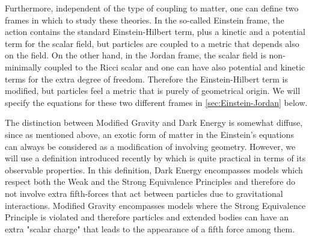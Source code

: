 Furthermore, independent of the type of coupling to matter,
one can define two frames in which to study these theories. 
In the so-called Einstein frame, the action contains the standard Einstein-Hilbert term, plus a kinetic and a potential term for the scalar field,
but particles are coupled to a metric that depends also
on the field. 
On the other hand, in the Jordan frame, the scalar field is non-minimally coupled
to the Ricci scalar and one can have also potential
and kinetic terms for the extra degree of freedom. Therefore the Einstein-Hilbert term is modified, but particles feel a metric that is purely of geometrical origin. We will specify the equations for these two different frames in
\cref{sec:Einstein-Jordan} below.


The distinction between Modified Gravity and Dark Energy is somewhat diffuse, since as mentioned above, 
an exotic form of matter in the Einstein's equations can always be considered as a modification 
of involving geometry. However, we will use a definition introduced recently by \cite{cite Joyce, Lombrisier, Schmidt}
which is quite practical in terms of its observable properties. 
In this definition, Dark Energy encompasses models which respect both the Weak and the Strong Equivalence
Principles and therefore do not involve extra fifth-forces that act between particles due to gravitational 
interactions. Modified Gravity encompasses models where the Strong Equivalence Principle is violated and therefore 
particles and extended bodies can have an extra "scalar charge" that leads to the appearance of a fifth force among them.

